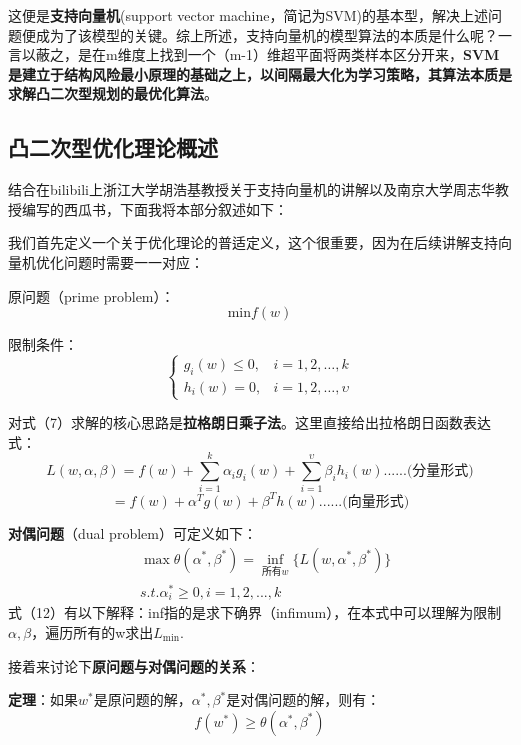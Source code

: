 这便是\textbf{支持向量机}(support vector machine，简记为SVM)的基本型，解决上述问题便成为了该模型的关键。综上所述，支持向量机的模型算法的本质是什么呢？一言以蔽之，是在m维度上找到一个（m-1）维超平面将两类样本区分开来，\textbf{SVM是建立于结构风险最小原理的基础之上，以间隔最大化为学习策略，其算法本质是求解凸二次型规划的最优化算法}。
\subsection{凸二次型优化理论概述}
结合在bilibili上浙江大学胡浩基教授关于支持向量机的讲解以及南京大学周志华教授编写的西瓜书，下面我将本部分叙述如下：

我们首先定义一个关于优化理论的普适定义，这个很重要，因为在后续讲解支持向量机优化问题时需要一一对应：

原问题（prime problem）：
\begin{equation}\mathrm{min}f(w)\end{equation}

限制条件：
\begin{equation}
	\begin{cases}
		g_i(w) \leq 0, & i = 1, 2, \ldots, k \\
		h_i(w) = 0, & i = 1, 2, \ldots, \upsilon
	\end{cases}
\end{equation}

对式（7）求解的核心思路是\textbf{拉格朗日乘子法}。这里直接给出拉格朗日函数表达式：
\begin{equation}L(w,\alpha,\beta)=f(w)+\sum_{i=1}^k\alpha_ig_i(w)+\sum_{i=1}^\upsilon\beta_ih_i(w)......(\text{分量形式)}\end{equation}
\begin{equation}=f(w)+\alpha^Tg(w)+\beta^Th(w)......(\text{向量形式)}\end{equation}

\textbf{对偶问题}（dual problem）可定义如下：
\begin{equation}\begin{aligned}&\max\theta(\alpha^*,\beta^*)=\inf_{\text{所有}w}\{L(w,\alpha^*,\beta^*)\}\\&s.t.\alpha_i^*\geq0,i=1,2,...,k\end{aligned}\end{equation}
式（12）有以下解释：inf指的是求下确界（infimum），在本式中可以理解为限制$\alpha,\beta $，遍历所有的w求出$L_{\min}$.

接着来讨论下\textbf{原问题与对偶问题的关系}：

\textbf{定理}：如果$w^{*}$是原问题的解，$\alpha^*,\beta^*$是对偶问题的解，则有：
\begin{equation}f(w^*)\geq\theta(\alpha^*,\beta^*)\end{equation}

